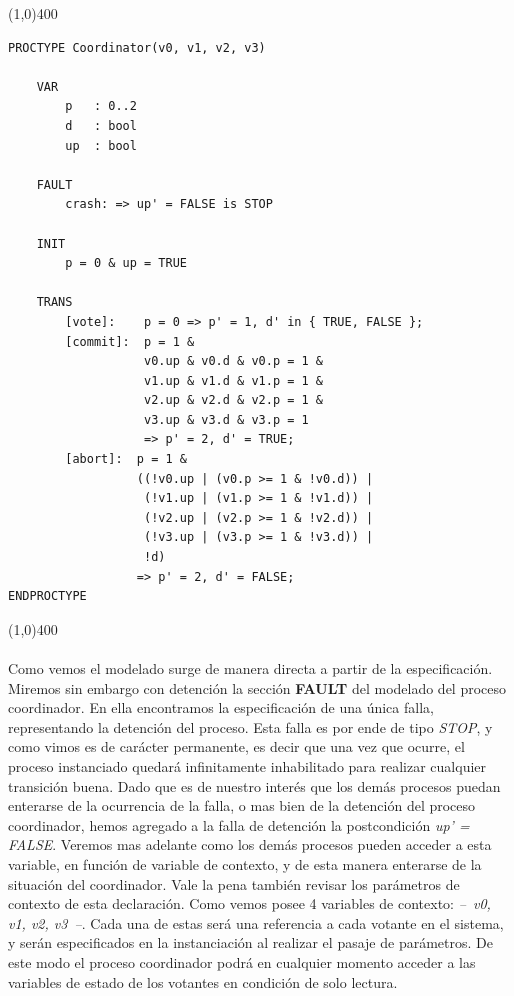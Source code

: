 \documentclass[titlepage, 12pt]{book}
\begin{document}
\noindent \line(1,0){400}
\begin{verbatim}
PROCTYPE Coordinator(v0, v1, v2, v3)

    VAR
        p   : 0..2
        d   : bool
        up  : bool
    
    FAULT 
        crash: => up' = FALSE is STOP

    INIT
        p = 0 & up = TRUE

    TRANS
        [vote]:    p = 0 => p' = 1, d' in { TRUE, FALSE };
        [commit]:  p = 1 &
                   v0.up & v0.d & v0.p = 1 &
                   v1.up & v1.d & v1.p = 1 &
                   v2.up & v2.d & v2.p = 1 &
                   v3.up & v3.d & v3.p = 1 
                   => p' = 2, d' = TRUE;
        [abort]:  p = 1 &
                  ((!v0.up | (v0.p >= 1 & !v0.d)) |
                   (!v1.up | (v1.p >= 1 & !v1.d)) |
                   (!v2.up | (v2.p >= 1 & !v2.d)) |
                   (!v3.up | (v3.p >= 1 & !v3.d)) |
                   !d)
                  => p' = 2, d' = FALSE;
ENDPROCTYPE
\end{verbatim}
\line(1,0){400}
~\\\\

Como vemos el modelado surge de manera directa a partir de la especificaci\'on. Miremos sin embargo con detenci\'on la secci\'on \textbf{FAULT} del modelado del proceso coordinador. En ella encontramos la especificaci\'on de una \'unica falla, representando la detenci\'on del proceso. Esta falla es por ende de tipo \textit{STOP}, y como vimos es de car\'acter permanente, es decir que una vez que ocurre, el proceso instanciado quedar\'a infinitamente inhabilitado para realizar cualquier transici\'on buena. Dado que es de nuestro inter\'es que los dem\'as procesos puedan enterarse de la ocurrencia de la falla, o mas bien de la detenci\'on del proceso coordinador, hemos agregado a la falla de detenci\'on la postcondici\'on \textit{up' = FALSE}. Veremos mas adelante como los dem\'as procesos pueden acceder a esta variable, en funci\'on de variable de contexto, y de esta manera enterarse de la situaci\'on del coordinador. Vale la pena tambi\'en revisar los par\'ametros de contexto de esta declaraci\'on. Como vemos posee 4 variables de contexto: \textit{--~v0, v1, v2, v3~--}. Cada una de estas ser\'a una referencia a cada votante en el sistema, y ser\'an especificados en la instanciaci\'on al realizar el pasaje de par\'ametros. De este modo el proceso coordinador podr\'a en cualquier momento acceder a las variables de estado de los votantes en condici\'on de solo lectura.\\
\end{document}

